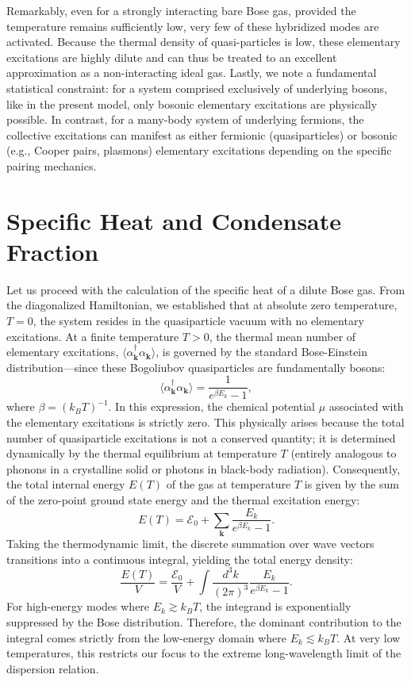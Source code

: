 Remarkably, even for a strongly interacting bare Bose gas, provided the temperature remains sufficiently low, very few of these hybridized modes are activated. Because the thermal density of quasi-particles is low, these elementary excitations are highly dilute and can thus be treated to an excellent approximation as a non-interacting ideal gas. Lastly, we note a fundamental statistical constraint: for a system comprised exclusively of underlying bosons, like in the present model, only bosonic elementary excitations are physically possible. In contrast, for a many-body system of underlying fermions, the collective excitations can manifest as either fermionic (quasiparticles) or bosonic (e.g., Cooper pairs, plasmons) elementary excitations depending on the specific pairing mechanics.

\section{Specific Heat and Condensate Fraction}

Let us proceed with the calculation of the specific heat of a dilute Bose gas. From the diagonalized Hamiltonian, we established that at absolute zero temperature, \( T = 0 \), the system resides in the quasiparticle vacuum with no elementary excitations. At a finite temperature \( T > 0 \), the thermal mean number of elementary excitations, \( \langle \alpha_{\mathbf{k}}^\dagger \alpha_{\mathbf{k}} \rangle \), is governed by the standard Bose-Einstein distribution—since these Bogoliubov quasiparticles are fundamentally bosons:
\[
    \langle \alpha_{\mathbf{k}}^\dagger \alpha_{\mathbf{k}} \rangle = \frac{1}{e^{\beta E_k} - 1},
\]
where \( \beta = (k_B T)^{-1} \). In this expression, the chemical potential \( \mu \) associated with the elementary excitations is strictly zero. This physically arises because the total number of quasiparticle excitations is not a conserved quantity; it is determined dynamically by the thermal equilibrium at temperature \( T \) (entirely analogous to phonons in a crystalline solid or photons in black-body radiation). Consequently, the total internal energy \( E(T) \) of the gas at temperature \( T \) is given by the sum of the zero-point ground state energy and the thermal excitation energy:
\[
    E(T) = \mathcal{E}_0 + \sum_{\mathbf{k}} \frac{E_k}{e^{\beta E_k} - 1}.
\]
Taking the thermodynamic limit, the discrete summation over wave vectors transitions into a continuous integral, yielding the total energy density:
\[
    \frac{E(T)}{V} = \frac{\mathcal{E}_0}{V} + \int \frac{d^3k}{(2\pi)^3} \frac{E_k}{e^{\beta E_k} - 1}.
\]
For high-energy modes where \( E_k \gtrsim k_B T \), the integrand is exponentially suppressed by the Bose distribution. Therefore, the dominant contribution to the integral comes strictly from the low-energy domain where \( E_k \lesssim k_B T \). At very low temperatures, this restricts our focus to the extreme long-wavelength limit of the dispersion relation.

